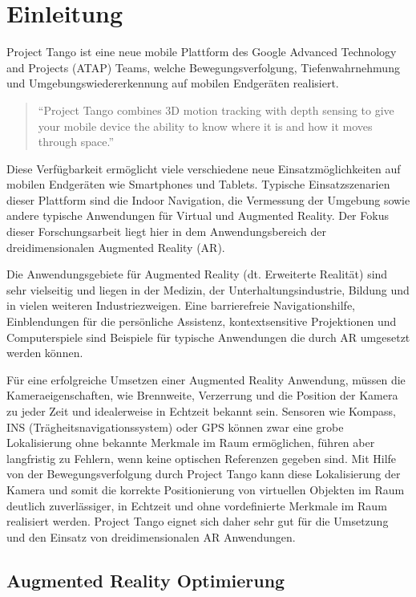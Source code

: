 \chapter{Einleitung}

Project Tango ist eine neue mobile Plattform des Google Advanced Technology and Projects (ATAP) Teams, welche Bewegungsverfolgung, Tiefenwahrnehmung und Umgebungswiedererkennung auf mobilen Endgeräten realisiert.

\begin{quotation}
\enquote{Project Tango combines 3D motion tracking with depth sensing to give your mobile device the ability to know where it is and how it moves through space.}  \citep{Proje19:online}
\end{quotation}

Diese Verfügbarkeit ermöglicht viele verschiedene neue Einsatzmöglichkeiten auf mobilen Endgeräten wie Smartphones und Tablets. Typische Einsatzszenarien dieser Plattform sind die Indoor Navigation, die Vermessung der Umgebung sowie andere typische Anwendungen für Virtual und Augmented Reality. Der Fokus dieser Forschungsarbeit liegt hier in dem Anwendungsbereich der dreidimensionalen Augmented Reality (AR). 

Die Anwendungsgebiete für Augmented Reality (dt. Erweiterte Realität) sind sehr vielseitig und liegen in der Medizin, der Unterhaltungsindustrie, Bildung und in vielen weiteren Industriezweigen. Eine barrierefreie Navigationshilfe, Einblendungen für die persönliche Assistenz, kontextsensitive Projektionen und Computerspiele sind Beispiele für typische Anwendungen die durch AR umgesetzt werden können. 

Für eine erfolgreiche Umsetzen einer Augmented Reality Anwendung, müssen die Kameraeigenschaften, wie Brennweite, Verzerrung und die Position der Kamera zu jeder Zeit und idealerweise in Echtzeit bekannt sein. Sensoren wie Kompass, INS (Trägheits\-navigations\-system) oder GPS können zwar eine grobe Lokalisierung ohne bekannte Merkmale im Raum ermöglichen, führen aber langfristig zu Fehlern, wenn keine optischen Referenzen gegeben sind. Mit Hilfe von der Bewegungsverfolgung durch Project Tango kann diese Lokalisierung der Kamera und somit die korrekte Positionierung von virtuellen Objekten im Raum deutlich zuverlässiger, in Echtzeit und ohne vordefinierte Merkmale im Raum realisiert werden. Project Tango eignet sich daher sehr gut für die Umsetzung und den Einsatz von dreidimensionalen AR Anwendungen.

\section{Augmented Reality Optimierung}


